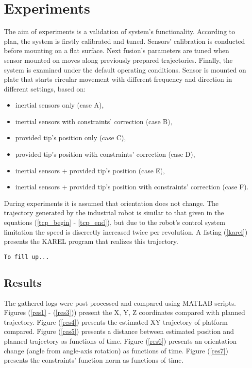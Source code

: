 \chapter{Experiments}

The aim of experiments is a validation of system's functionality. According to plan, the system is firstly calibrated and tuned. Sensors' calibration is conducted before mounting on a flat surface. Next fusion's parameters are tuned when sensor mounted on  moves along previously prepared trajectories. Finally, the system is examined under the default operating conditions. Sensor is mounted on plate that starts circular movement with different frequency and direction in different settings, based on:
\begin{itemize}
	\item inertial sensors only (case A),
	\item inertial sensors with constraints' correction (case B),
	\item provided tip's position only (case C),
	\item provided tip's position with constraints' correction (case D),
	\item inertial sensors + provided tip's position (case E),
	\item inertial sensors + provided tip's position with constraints' correction (case F).
\end{itemize}

During experiments it is assumed that orientation does not change. The trajectory generated by the industrial robot is similar to that given in the equations (\ref{tcp_begin} - \ref{tcp_end}), but due to the robot's control system limitation the speed is discreetly increased twice per revolution. A listing (\ref{karel}) presents the KAREL program that realizes this trajectory.

\begin{lstlisting}[caption={The KAREL program realizing a circular motion}, captionpos=b, label=karel]
	To fill up...
\end{lstlisting}


\section{Results}

The gathered logs were post-processed and compared using MATLAB scripts. Figures (\ref{res1} - (\ref{res3})) present the X, Y, Z coordinates compared with planned trajectory. Figure (\ref{res4}) presents the estimated XY trajectory of platform compared.
Figure (\ref{res5}) presents a distance between estimated position and planned trajectory as functions of time. Figure (\ref{res6}) presents an orientation change (angle from angle-axis rotation) as functions of time. Figure (\ref{res7}) presents the constraints' function norm as functions of time.

